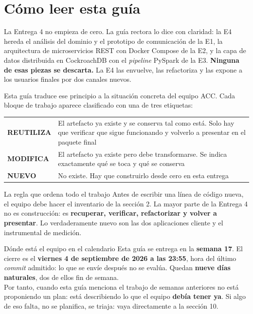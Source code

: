 \documentclass[11pt,a4paper]{article}
\newcommand{\reuso}{\cellcolor{filaReuso}\textbf{REUTILIZA}}
\newcommand{\cambia}{\cellcolor{filaCambia}\textbf{MODIFICA}}
\newcommand{\nuevo}{\cellcolor{filaNuevo}\textbf{NUEVO}}
\begin{document}
\tableofcontents
\newpage

\section{Cómo leer esta guía}

La Entrega 4 no empieza de cero. La guía rectora lo dice con claridad: la E4 hereda el análisis del dominio y el prototipo de comunicación de la E1, la arquitectura de microservicios REST con Docker Compose de la E2, y la capa de datos distribuida en CockroachDB con el \emph{pipeline} PySpark de la E3. \textbf{Ninguna de esas piezas se descarta.} La E4 las envuelve, las refactoriza y las expone a los usuarios finales por dos canales nuevos.

Esta guía traduce ese principio a la situación concreta del equipo ACC. Cada bloque de trabajo aparece clasificado con una de tres etiquetas:

\begin{center}
	\small
	\begin{tabular}{@{}p{2.6cm}p{12.6cm}@{}}
		\toprule
		\reuso & El artefacto ya existe y se conserva tal como está. Solo hay que verificar que sigue funcionando y volverlo a presentar en el paquete final \\
		\addlinespace
		\cambia & El artefacto ya existe pero debe transformarse. Se indica exactamente qué se toca y qué se conserva \\
		\addlinespace
		\nuevo & No existe. Hay que construirlo desde cero en esta entrega \\
		\bottomrule
	\end{tabular}
\end{center}

\begin{uteqbox}{La regla que ordena todo el trabajo}
	Antes de escribir una línea de código nueva, el equipo debe hacer el inventario de la sección 2. La mayor parte de la Entrega 4 no es construcción: es \textbf{recuperar, verificar, refactorizar y volver a presentar}. Lo verdaderamente nuevo son las dos aplicaciones cliente y el instrumental de medición.
\end{uteqbox}

\begin{pisoBox}{Dónde está el equipo en el calendario}
	Esta guía se entrega en la \textbf{semana 17}. El cierre es el \textbf{viernes 4 de septiembre de 2026 a las 23:55}, hora del último \emph{commit} admitido: lo que se envíe después no se evalúa. Quedan \textbf{nueve días naturales}, dos de ellos fin de semana.\\[5pt]
	Por tanto, cuando esta guía menciona el trabajo de semanas anteriores no está proponiendo un plan: está describiendo lo que el equipo \textbf{debía tener ya}. Si algo de eso falta, no se planifica, se triaja: vaya directamente a la sección 10.
\end{pisoBox}
\end{document}
